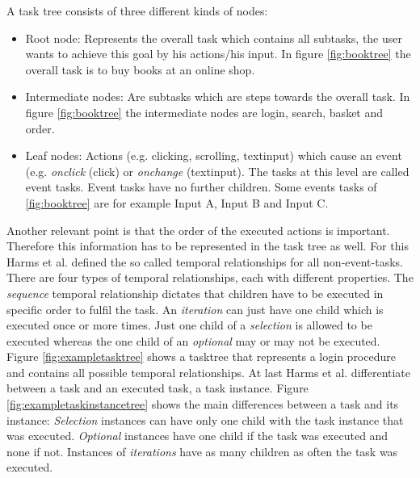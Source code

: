 A task tree consists of three different kinds of nodes:
\begin{itemize} 
	\item Root node: Represents the overall task which contains all subtasks, the user wants to achieve this goal by his actions/his input. 
		In figure \ref{fig:booktree} the overall task is to buy books at an online shop.
	\item Intermediate nodes: Are subtasks which are steps towards the overall task. In figure \ref{fig:booktree} the intermediate nodes are login, search, basket and order.
	\item Leaf nodes: Actions (e.g. clicking, scrolling, textinput) which cause an event (e.g. \textit{onclick} (click) or \textit{onchange} (textinput). The tasks at this level are called event tasks. Event tasks have no further children. Some events tasks of \ref{fig:booktree} are for example Input A, Input B and Input C.
\end{itemize}
Another relevant point is that the order of the executed actions is important. Therefore this information has to be represented in the task tree as well. For this Harms et al. defined the so called temporal relationships for all non-event-tasks. There are four types of temporal relationships, each with different properties. The \textit{sequence} temporal relationship dictates that children have to be executed in specific order to fulfil the task. An \textit{iteration} can just have one child which is executed once or more times. Just one child of a \textit{selection} is allowed to be executed whereas the one child of an \textit{optional} may or may not be executed. Figure \ref{fig:exampletasktree} shows a tasktree that represents a login procedure and contains all possible temporal relationships. At last Harms et al. differentiate between a task and an executed task, a task instance. Figure \ref{fig:exampletaskinstancetree} shows the main differences between a task and its instance: \textit{Selection} instances can have only one child with the task instance that was executed. \textit{Optional} instances have one child if the task was executed and none if not. Instances of \textit{iterations} have as many children as often the task was executed.
